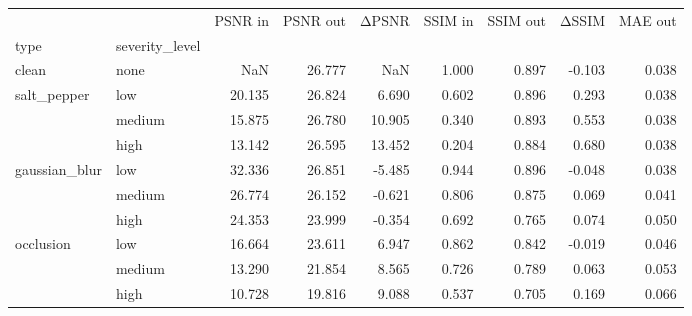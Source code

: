 \begin{tabular}{llrrrrrrr}
\toprule
 &  & PSNR in & PSNR out & ΔPSNR & SSIM in & SSIM out & ΔSSIM & MAE out \\
type & severity_level &  &  &  &  &  &  &  \\
\midrule
clean & none & NaN & 26.777 & NaN & 1.000 & 0.897 & -0.103 & 0.038 \\
\cline{1-9}
\multirow[t]{3}{*}{salt_pepper} & low & 20.135 & 26.824 & 6.690 & 0.602 & 0.896 & 0.293 & 0.038 \\
 & medium & 15.875 & 26.780 & 10.905 & 0.340 & 0.893 & 0.553 & 0.038 \\
 & high & 13.142 & 26.595 & 13.452 & 0.204 & 0.884 & 0.680 & 0.038 \\
\cline{1-9}
\multirow[t]{3}{*}{gaussian_blur} & low & 32.336 & 26.851 & -5.485 & 0.944 & 0.896 & -0.048 & 0.038 \\
 & medium & 26.774 & 26.152 & -0.621 & 0.806 & 0.875 & 0.069 & 0.041 \\
 & high & 24.353 & 23.999 & -0.354 & 0.692 & 0.765 & 0.074 & 0.050 \\
\cline{1-9}
\multirow[t]{3}{*}{occlusion} & low & 16.664 & 23.611 & 6.947 & 0.862 & 0.842 & -0.019 & 0.046 \\
 & medium & 13.290 & 21.854 & 8.565 & 0.726 & 0.789 & 0.063 & 0.053 \\
 & high & 10.728 & 19.816 & 9.088 & 0.537 & 0.705 & 0.169 & 0.066 \\
\cline{1-9}
\bottomrule
\end{tabular}
